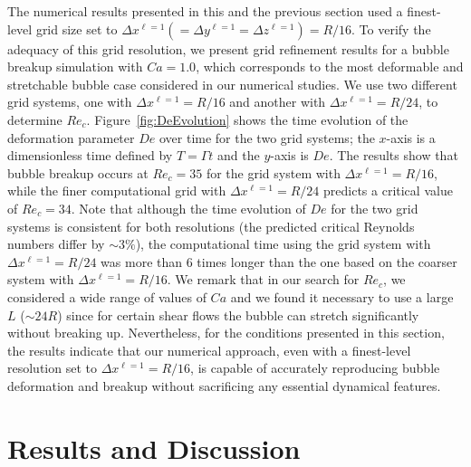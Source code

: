 \documentclass[%
 reprint,
 showkeys,
 amsmath,amssymb,
 aps,
 prfluids,
 onecolumn
]{revtex4-2}
\begin{document}
The numerical results presented in this and the previous section used a
finest-level grid size set to $\Delta x^{\ell=1}(= \Delta y^{\ell=1}= \Delta
z^{\ell=1})=R/16$. To verify the adequacy of this grid resolution, we present
grid refinement results for a bubble breakup simulation with $Ca=1.0$, which
corresponds to the most deformable and stretchable bubble case considered in
our numerical studies. We use two different grid systems, one with $\Delta
x^{\ell=1}=R/16$ and another with $\Delta x^{\ell=1}=R/24$, to determine
$Re_c$.  Figure~\ref{fig:DeEvolution} shows the time evolution of the
deformation parameter $De$ over time for the two grid systems; the $x$-axis is
a dimensionless time defined by $T=\mathit{\Gamma} t$ and the $y$-axis is $De$.
The results show that bubble breakup occurs at $Re_c = 35$ for the grid system
with $\Delta x^{\ell=1}=R/16$, while the finer computational grid with $\Delta
x^{\ell=1}=R/24$ predicts a critical value of $Re_c = 34$.  Note that although
the time evolution of $De$ for the two grid systems is consistent for both
resolutions (the predicted critical Reynolds numbers differ by $\sim 3\%$), the
computational time using the grid system with $\Delta x^{\ell=1}=R/24$ was more
than 6 times longer than the one based on the coarser system with $\Delta
x^{\ell=1}=R/16$.  We remark that in our search for $Re_c$, we considered a
wide range of values of $Ca$ and we found it necessary to use a large $L$
($\sim 24R$) since for certain shear flows the bubble can stretch significantly
without breaking up.  Nevertheless, for the conditions presented in this
section, the results indicate that our numerical approach, even with a
finest-level resolution set to $\Delta x^{\ell=1}=R/16$, is capable of
accurately reproducing bubble deformation and breakup without sacrificing any
essential dynamical features.


\section{Results and Discussion}
\end{document}
